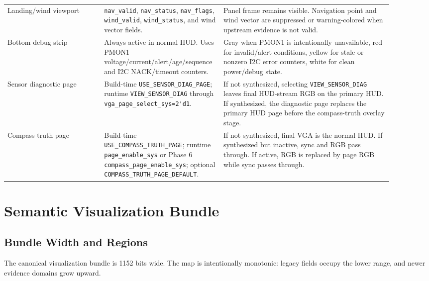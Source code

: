 \documentclass{article}
\newcommand{\sig}[1]{\begingroup\nolinkurl{#1}\endgroup}
\newcommand{\param}[1]{\begingroup\nolinkurl{#1}\endgroup}
\begin{document}
\begin{longtable}{p{0.24\linewidth} p{0.24\linewidth} p{0.42\linewidth}}
Landing/wind viewport &
\sig{nav_valid}, \sig{nav_status}, \sig{nav_flags}, \sig{wind_valid},
\sig{wind_status}, and wind vector fields. &
Panel frame remains visible.  Navigation point and wind vector are suppressed
or warning-colored when upstream evidence is not valid. \\

Bottom debug strip &
Always active in normal HUD.  Uses PMON1 voltage/current/alert/age/sequence and
I2C NACK/timeout counters. &
Gray when PMON1 is intentionally unavailable, red for invalid/alert conditions,
yellow for stale or nonzero I2C error counters, white for clean power/debug
state. \\

Sensor diagnostic page &
Build-time \param{USE_SENSOR_DIAG_PAGE}; runtime
\sig{VIEW_SENSOR_DIAG} through \sig{vga_page_select_sys=2'd1}. &
If not synthesized, selecting \sig{VIEW_SENSOR_DIAG} leaves final HUD-stream RGB
on the primary HUD.  If synthesized, the diagnostic page replaces the primary
HUD page before the compass-truth overlay stage. \\

Compass truth page &
Build-time \param{USE_COMPASS_TRUTH_PAGE}; runtime \sig{page_enable_sys} or
Phase 6 \sig{compass_page_enable_sys}; optional
\param{COMPASS_TRUTH_PAGE_DEFAULT}. &
If not synthesized, final VGA is the normal HUD.  If synthesized but inactive,
sync and RGB pass through.  If active, RGB is replaced by page RGB while sync
passes through. \\
\bottomrule
\end{longtable}

\section{Semantic Visualization Bundle}

\subsection{Bundle Width and Regions}

The canonical visualization bundle is 1152 bits wide.  The map is intentionally
monotonic: legacy fields occupy the lower range, and newer evidence domains grow
upward.
\end{document}
